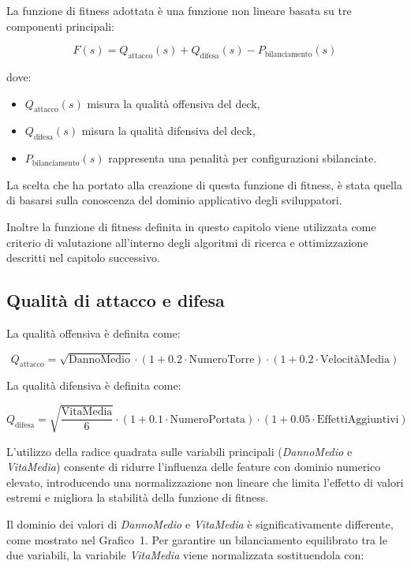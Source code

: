 \documentclass{article}
\begin{document}
La funzione di fitness adottata è una funzione non lineare basata su tre componenti principali:

\[
F(s) = Q_{\text{attacco}}(s) + Q_{\text{difesa}}(s) - P_{\text{bilanciamento}}(s)
\]

dove:
\begin{itemize}
    \item $Q_{\text{attacco}}(s)$ misura la qualità offensiva del deck,
    \item $Q_{\text{difesa}}(s)$ misura la qualità difensiva del deck,
    \item $P_{\text{bilanciamento}}(s)$ rappresenta una penalità per configurazioni sbilanciate.
\end{itemize}

La scelta che ha portato alla creazione di questa funzione di fitness, è stata quella di basarsi sulla conoscenza del dominio applicativo degli sviluppatori.

Inoltre la funzione di fitness definita in questo capitolo viene utilizzata come criterio di valutazione all’interno degli algoritmi di ricerca e ottimizzazione descritti nel capitolo successivo.

\subsection{Qualità di attacco e difesa}

La qualità offensiva è definita come:

\[
Q_{\text{attacco}} = \sqrt{\text{DannoMedio}} \cdot (1 + 0.2 \cdot \text{NumeroTorre}) \cdot (1 + 0.2 \cdot \text{VelocitàMedia})
\]

La qualità difensiva è definita come:

\[
Q_{\text{difesa}} = \sqrt{\frac{\text{VitaMedia}}{6}} \cdot (1 + 0.1 \cdot \text{NumeroPortata}) \cdot (1 + 0.05 \cdot \text{EffettiAggiuntivi})
\]

L’utilizzo della radice quadrata sulle variabili principali (\textit{DannoMedio} e \textit{VitaMedia}) consente di ridurre l’influenza delle feature con dominio numerico elevato, introducendo una normalizzazione non lineare che limita l’effetto di valori estremi e migliora la stabilità della funzione di fitness.

\medskip
Il dominio dei valori di \textit{DannoMedio} e \textit{VitaMedia} è significativamente differente, come mostrato nel Grafico~1. 
Per garantire un bilanciamento equilibrato tra le due variabili, la variabile \textit{VitaMedia} viene normalizzata sostituendola con:
\end{document}
